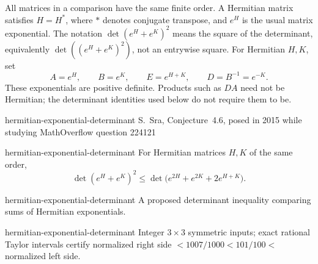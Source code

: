 \begin{cxcredits}
\end{cxcredits}

\begin{cxcontext}
All matrices in a comparison have the same finite order. A Hermitian matrix
satisfies $H=H^*$, where $*$ denotes conjugate transpose, and $e^H$ is the
usual matrix exponential. The notation $\det(e^H+e^K)^2$ means the square
of the determinant, equivalently $\det((e^H+e^K)^2)$, not an entrywise square.
For Hermitian $H,K$, set
\[
 A=e^H,\qquad B=e^K,\qquad E=e^{H+K},\qquad D=B^{-1}=e^{-K}.
\]
These exponentials are positive definite. Products such as $DA$ need not
be Hermitian; the determinant identities used below do not require them to be.
\end{cxcontext}

\begin{cxsource}{hermitian-exponential-determinant}
S.~Sra, Conjecture~4.6, posed in 2015 while studying MathOverflow question
224121 \citep{Wolfgang2015MO}
\end{cxsource}

\begin{cxstatement}{hermitian-exponential-determinant}
For Hermitian matrices $H,K$ of the same order,
\[
 \det(e^H+e^K)^2
 \leq \det\bigl(e^{2H}+e^{2K}+2e^{H+K}\bigr).
\]
\end{cxstatement}

\begin{cxsummary}{hermitian-exponential-determinant}
A proposed determinant inequality comparing sums of Hermitian exponentials.
\end{cxsummary}

\begin{cxcertificate}{hermitian-exponential-determinant}
Integer $3\times3$ symmetric inputs; exact rational Taylor intervals certify normalized right side $<1007/1000<101/100<$ normalized left side.
\end{cxcertificate}


